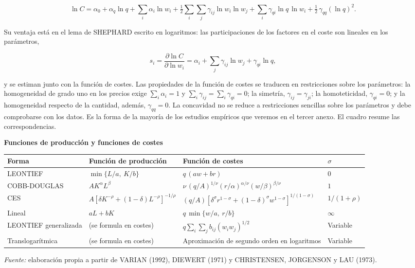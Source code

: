 \documentclass[10pt,a4paper]{article}
\newcounter{anexo}
\begin{document}
$$\ln C=\alpha_0+\alpha_q\ln q+\sum_i\alpha_i\ln w_i+\tfrac12\sum_i\sum_j\gamma_{ij}\ln w_i\ln w_j+\sum_i\gamma_{qi}\ln q\,\ln w_i+\tfrac12\,\gamma_{qq}(\ln q)^2.$$

Su ventaja está en el lema de SHEPHARD escrito en logaritmos: las participaciones de los factores en el coste son lineales en los parámetros,

$$s_i=\frac{\partial\ln C}{\partial\ln w_i}=\alpha_i+\sum_j\gamma_{ij}\ln w_j+\gamma_{qi}\ln q,$$

y se estiman junto con la función de costes. Las propiedades de la función de costes se traducen en restricciones sobre los parámetros: la homogeneidad de grado uno en los precios exige $\sum_i\alpha_i=1$ y $\sum_i\gamma_{ij}=\sum_i\gamma_{qi}=0$; la simetría, $\gamma_{ij}=\gamma_{ji}$; la homoteticidad, $\gamma_{qi}=0$; y la homogeneidad respecto de la cantidad, además, $\gamma_{qq}=0$. La concavidad no se reduce a restricciones sencillas sobre los parámetros y debe comprobarse con los datos. Es la forma de la mayoría de los estudios empíricos que veremos en el tercer anexo. El cuadro resume las correspondencias.

\begin{center}\begin{minipage}{\linewidth}\centering
{\small\textbf{Funciones de producción y funciones de costes}}\par\vspace{0.3em}
\footnotesize
\begin{tabular}{p{2.6cm} p{3.5cm} p{5.6cm} p{1.5cm}}
\hline
\raggedright\textbf{Forma} & \raggedright\textbf{Función de producción} & \raggedright\textbf{Función de costes} & \raggedright\textbf{$\sigma$}\tabularnewline
\hline
\raggedright LEONTIEF & \raggedright $\min\{L/a,\ K/b\}$ & \raggedright $q\,(aw+br)$ & \raggedright $0$\tabularnewline
\raggedright COBB-DOUGLAS & \raggedright $AK^\alpha L^\beta$ & \raggedright $\nu\,(q/A)^{1/\nu}(r/\alpha)^{\alpha/\nu}(w/\beta)^{\beta/\nu}$ & \raggedright $1$\tabularnewline
\raggedright CES & \raggedright $A\left[\delta K^{-\rho}+(1-\delta)L^{-\rho}\right]^{-1/\rho}$ & \raggedright $(q/A)\left[\delta^\sigma r^{1-\sigma}+(1-\delta)^\sigma w^{1-\sigma}\right]^{1/(1-\sigma)}$ & \raggedright $1/(1+\rho)$\tabularnewline
\raggedright Lineal & \raggedright $aL+bK$ & \raggedright $q\,\min\{w/a,\ r/b\}$ & \raggedright $\infty$\tabularnewline
\raggedright LEONTIEF generalizada & \raggedright (se formula en costes) & \raggedright $q\sum_i\sum_j b_{ij}(w_iw_j)^{1/2}$ & \raggedright Variable\tabularnewline
\raggedright Translogarítmica & \raggedright (se formula en costes) & \raggedright Aproximación de segundo orden en logaritmos & \raggedright Variable\tabularnewline
\hline
\end{tabular}\par\vspace{0.3em}
{\small\textit{Fuente: }elaboración propia a partir de VARIAN (1992), DIEWERT (1971) y CHRISTENSEN, JORGENSON y LAU (1973).}
\end{minipage}\end{center}
\end{document}
